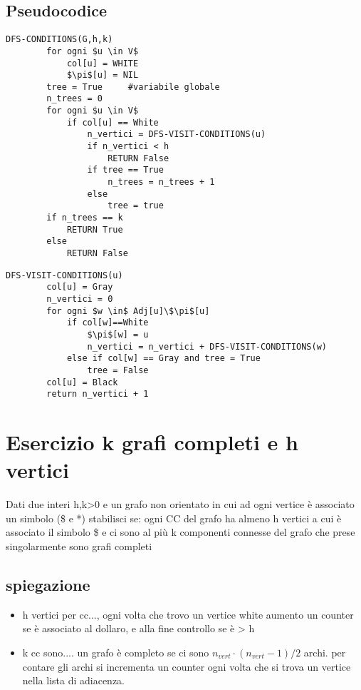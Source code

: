 \documentclass[12pt, a4paper, openany]{book}
\begin{document}
	\subsection*{Pseudocodice}
	\begin{lstlisting}[mathescape=true]
    DFS-CONDITIONS(G,h,k)
        for ogni $u \in V$
            col[u] = WHITE
            $\pi$[u] = NIL
        tree = True     #variabile globale
        n_trees = 0
        for ogni $u \in V$
            if col[u] == White
                n_vertici = DFS-VISIT-CONDITIONS(u)
                if n_vertici < h
                    RETURN False
                if tree == True
                    n_trees = n_trees + 1
                else
                    tree = true
        if n_trees == k
            RETURN True
        else
            RETURN False
\end{lstlisting}

	\begin{lstlisting}[mathescape=true]
    DFS-VISIT-CONDITIONS(u)
        col[u] = Gray
        n_vertici = 0
        for ogni $w \in$ Adj[u]\$\pi$[u]
            if col[w]==White
                $\pi$[w] = u
                n_vertici = n_vertici + DFS-VISIT-CONDITIONS(w)
            else if col[w] == Gray and tree = True
                tree = False
        col[u] = Black
        return n_vertici + 1
\end{lstlisting}

	\section{Esercizio k grafi completi e h vertici}
	Dati due interi h,k>0 e un grafo non orientato  in cui ad ogni vertice è associato un simbolo (\$ e *)
	stabilisci se: ogni CC del grafo ha almeno h vertici a cui è associato il simbolo \$
	e ci sono al più k componenti connesse del grafo che prese singolarmente sono grafi completi

	\subsection*{spiegazione}
	\begin{itemize}
		\item h vertici per cc..., ogni volta che trovo un vertice white aumento un counter se è associato al dollaro, e alla fine controllo se è > h
		\item k cc sono.... un grafo è completo se ci sono $n_{vert} \cdot (n_{vert} -1)/2$ archi. per contare gli archi si incrementa un counter ogni volta che si trova un vertice nella lista di adiacenza.
	\end{itemize}
\end{document}
